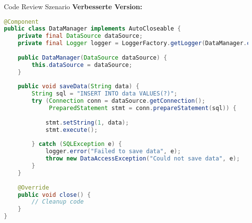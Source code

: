 \begin{example2}{Code Review Szenario}
\textbf{Verbesserte Version:}
\begin{lstlisting}[language=Java, style=base]
@Component
public class DataManager implements AutoCloseable {
    private final DataSource dataSource;
    private final Logger logger = LoggerFactory.getLogger(DataManager.class);
    
    public DataManager(DataSource dataSource) {
        this.dataSource = dataSource;
    }
    
    public void saveData(String data) {
        String sql = "INSERT INTO data VALUES(?)";
        try (Connection conn = dataSource.getConnection();
             PreparedStatement stmt = conn.prepareStatement(sql)) {
            
            stmt.setString(1, data);
            stmt.execute();
            
        } catch (SQLException e) {
            logger.error("Failed to save data", e);
            throw new DataAccessException("Could not save data", e);
        }
    }
    
    @Override
    public void close() {
        // Cleanup code
    }
}
\end{lstlisting}
\end{example2}